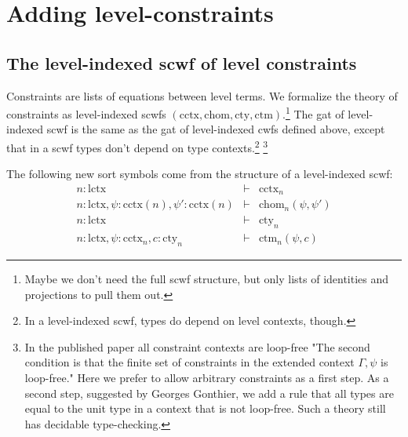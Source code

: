 \documentclass[11pt,a4paper]{article}
\theoremstyle{definition}
\def\lctx{\mathrm{lctx}}
\def\cctx{\mathrm{cctx}}
\def\cty{\mathrm{cty}}
\def\ctm{\mathrm{ctm}}
\def\chom{\mathrm{chom}}
\begin{document}
\section{Adding level-constraints}

\subsection{The level-indexed scwf of level constraints}

Constraints are lists of equations between level terms. We formalize the theory of constraints as level-indexed scwfs $(\cctx, \chom, \cty, \ctm)$.\footnote{Maybe we don't need the full scwf structure, but only lists of identities and projections to pull them out.} The gat of level-indexed scwf is the same as the gat of level-indexed cwfs defined above, except that in a scwf types don't depend on type contexts.\footnote{In a level-indexed scwf, types do depend on level contexts, though.} \footnote{In the published paper all constraint contexts are loop-free "The second condition is that the finite set of constraints in the extended context $\Gamma, \psi$ is loop-free." Here we prefer to allow arbitrary constraints as a first step. As a second step, suggested by Georges Gonthier, we add a rule that all types are equal to the unit type in a context that is not loop-free. Such a theory still has decidable type-checking.}

The following new sort symbols come from the structure of a level-indexed scwf:
\begin{eqnarray*}
n : \lctx &\vdash& \cctx_n\\
n : \lctx, \psi : \cctx(n), \psi' : \cctx(n) &\vdash& \chom_n(\psi,\psi')\\
n : \lctx &\vdash& \cty_n\\
n : \lctx, \psi : \cctx_n, c : \cty_n &\vdash& \ctm_n(\psi,c)
\end{eqnarray*}
\end{document}
